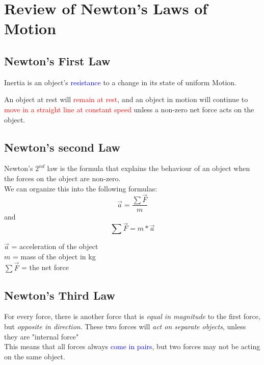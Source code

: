 \section{Review of Newton's Laws of Motion}
\subsection{Newton's First Law}
Inertia is an object's \textcolor{blue}{resistance} to a change in its state of uniform Motion.
\begin{example}
    An object at rest will \textcolor{red}{remain at rest}, and an object in motion will continue
    to \textcolor{red}{move in a straight line at constant speed} unless a non-zero net force acts on 
    the object.
\end{example}

\subsection{Newton's second Law}
Newton's $2^{nd}$ law is the formula that explains the behaviour of an object when the forces on the object 
are non-zero. \\
We can organize this into the following formulas:
\begin{equation}
    \vec{a} = \frac{\sum \vec{F}}{m}
\end{equation}
and\\
\begin{equation}
    \sum \vec{F} = m * \vec{a}
\end{equation}
\begin{center}
    $\vec{a}$ = acceleration of the object \\ 
    $m$ = mass of the object in kg \\ 
    $\sum \vec{F}$ = the net force
\end{center}

\subsection{Newton's Third Law}
For every force, there is another force that is \textit{equal in magnitude} to the first force, 
but \textit{opposite in direction}. These two forces will \textit{act on separate objects},
unless they are "internal force"\\ 
This means that all forces always \textcolor{blue}{come in pairs}, but two forces may not be 
acting on the same object. \\

